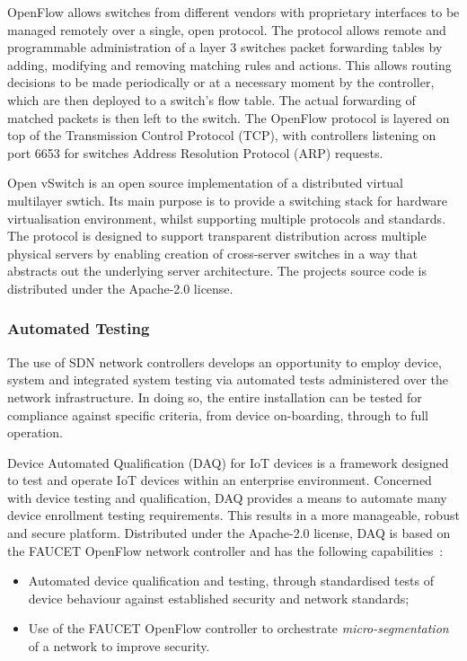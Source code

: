 \documentclass[11pt, oneside]{book}   	%
\begin{document}
OpenFlow allows switches from different vendors with proprietary interfaces to be managed remotely over a single, open protocol.
The protocol allows remote and programmable administration of a layer 3 switches packet forwarding tables by adding, modifying and removing matching rules and actions.
This allows routing decisions to be made periodically or at a necessary moment by the controller, which are then deployed to a switch's flow table.
The actual forwarding of matched packets is then left to the switch.
The OpenFlow protocol is layered on top of the Transmission Control Protocol (TCP), with controllers listening on port 6653 for switches Address Resolution Protocol (ARP) requests.\

Open vSwitch is an open source implementation of a distributed virtual multilayer swtich.
Its main purpose is to provide a switching stack for hardware virtualisation environment, whilst supporting multiple protocols and standards.
The protocol is designed to support transparent distribution across multiple physical servers by enabling creation of cross-server switches in a way that abstracts out the underlying server architecture.
The projects source code is distributed under the Apache-2.0 license.

\subsubsection{Automated Testing}
The use of SDN network controllers develops an opportunity to employ device, system and integrated system testing via automated tests administered over the network infrastructure.
In doing so, the entire installation can be tested for compliance against specific criteria, from device on-boarding, through to full operation.

Device Automated Qualification (DAQ) for IoT devices is a framework designed to test and operate IoT devices within an enterprise environment.
Concerned with device testing and qualification, DAQ provides a means to automate many device enrollment testing requirements.
This results in a more manageable, robust and secure platform.
Distributed under the Apache-2.0 license, DAQ is based on the FAUCET OpenFlow network controller and has the following capabilities~\cite{daq1}:
\begin{itemize}
	\item Automated device qualification and testing, through standardised tests of device behaviour against established security and network standards; 
	\item Use of the FAUCET OpenFlow controller to orchestrate \emph{micro-segmentation} of a network to improve security.
\end{itemize}\
\end{document}
